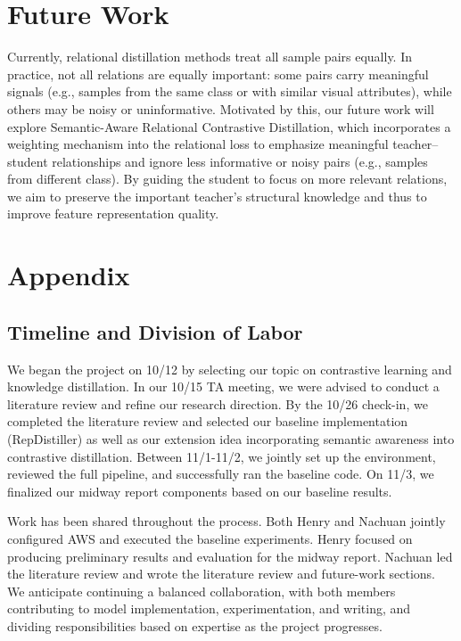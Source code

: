 \documentclass{article}
\begin{document}
\section{Future Work}
Currently, relational distillation methods treat all sample pairs equally. In practice, not all relations are equally important: some pairs carry meaningful signals (e.g., samples from the same class or with similar visual attributes), while others may be noisy or uninformative. Motivated by this, our future work will explore Semantic-Aware Relational Contrastive Distillation, which incorporates a weighting mechanism into the relational loss to emphasize meaningful teacher–student relationships and ignore less informative or noisy pairs (e.g., samples from different class). By guiding the student to focus on more relevant relations, we aim to preserve the important teacher’s structural knowledge and thus to improve feature representation quality.




\appendix

\section{Appendix}

\subsection{Timeline and Division of Labor}

We began the project on 10/12 by selecting our topic on contrastive learning and knowledge distillation. In our 10/15 TA meeting, we were advised to conduct a literature review and refine our research direction. By the 10/26 check-in, we completed the literature review and selected our baseline implementation (RepDistiller) as well as our extension idea incorporating semantic awareness into contrastive distillation. Between 11/1-11/2, we jointly set up the environment, reviewed the full pipeline, and successfully ran the baseline code. On 11/3, we finalized our midway report components based on our baseline results.

Work has been shared throughout the process. Both Henry and Nachuan jointly configured AWS and executed the baseline experiments. Henry focused on producing preliminary results and evaluation for the midway report. Nachuan led the literature review and wrote the literature review and future-work sections. We anticipate continuing a balanced collaboration, with both members contributing to model implementation, experimentation, and writing, and dividing responsibilities based on expertise as the project progresses.
\end{document}
